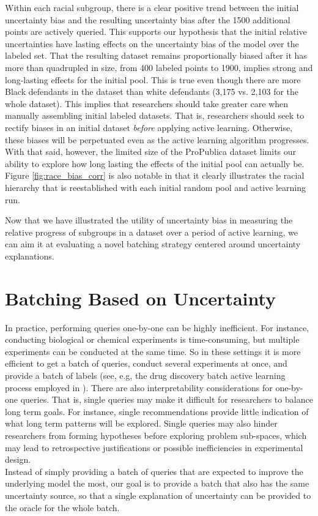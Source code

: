 Within each racial subgroup, there is a clear positive trend between the initial uncertainty bias and the resulting uncertainty bias after the 1500 additional points are actively queried. This supports our hypothesis that the initial relative uncertainties have lasting effects on the uncertainty bias of the model over the labeled set. That the resulting dataset remains proportionally biased after it has more than quadrupled in size, from 400 labeled points to 1900, implies strong and long-lasting effects for the initial pool. This is true even though there are more Black defendants in the dataset than white defendants (3,175 vs. 2,103 for the whole dataset). This implies that researchers should take greater care when manually assembling initial labeled datasets. That is, researchers should seek to rectify biases in an initial dataset \textit{before} applying active learning. Otherwise, these biases will be perpetuated even as the active learning algorithm progresses. With that said, however, the limited size of the ProPublica dataset limits our ability to explore how long lasting the effects of the initial pool can actually be. Figure \ref{fig:race_bias_corr} is also notable in that it clearly illustrates the racial hierarchy that is reestablished with each initial random pool and active learning run. 

Now that we have illustrated the utility of uncertainty bias in measuring the relative progress of subgroups in a dataset over a period of active learning, we can aim it at evaluating a novel batching strategy centered around uncertainty explanations.


\section{Batching Based on Uncertainty}
In practice, performing queries one-by-one can be highly inefficient. For instance, conducting biological or chemical experiments is time-consuming, but multiple experiments can be conducted at the same time. So in these settings it is more efficient to get a batch of queries, conduct several experiments at once, and provide a batch of labels (see, e.g, the drug discovery batch active learning process employed in \cite{NIPS2001_2097}). There are also interpretability considerations for one-by-one queries. That is, single queries may make it difficult for researchers to balance long term goals. For instance, single recommendations provide little indication of what long term patterns will be explored. Single queries may also hinder researchers from forming hypotheses before exploring problem sub-spaces, which may lead to retrospective justifications or possible inefficiencies in experimental design. \\
\indent Instead of simply providing a batch of queries that are expected to improve the underlying model the most, our goal is to provide a batch that also has the same uncertainty source, so that a single explanation of uncertainty can be provided to the oracle for the whole batch.


